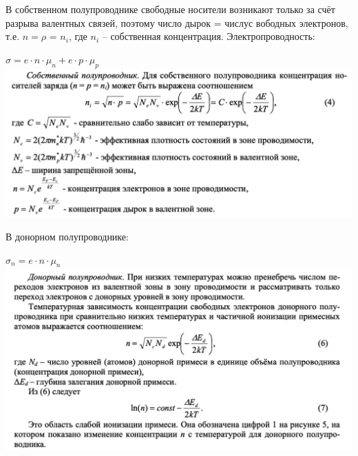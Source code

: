 \documentclass[a4paper,12pt]{article}
\begin{document}
\pagecolor{white}
\large



В собственном полупроводнике свободные носители возникают только за счёт разрыва валентных связей, поэтому число дырок = числус вободных электронов, т.е. $n= \rho$ = $n_i$, где $n_i$ – собственная концентрация. Электропроводность:
\begin{center}
$\sigma = e\cdot n \cdot \mu_n + e\cdot p \cdot \mu_p$
\includegraphics[height = 7 cm,width=18 cm]{1.png}
\end{center}

В донорном полупроводнике:
\begin{center}
$\sigma_n = e\cdot n \cdot \mu_n$\\
\includegraphics[height = 9 cm,width=18 cm]{3.png}
\end{center}
\end{document}
